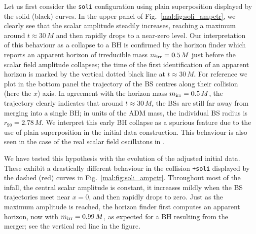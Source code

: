 %
Let us first consider the {\tt soli} configuration using plain
superposition displayed by the solid (black) curves. In the upper
panel of Fig.~\ref{mal:fig:soli_ampctr}, we clearly see
that the scalar amplitude steadily increases, reaching a maximum
around $t\approx 30\,M$ and then rapidly drops to a near-zero level.
Our interpretation of this behaviour as a collapse to a BH is confirmed
by the horizon finder which reports an apparent horizon of irreducible
mass $m_{\rm irr}=0.5\,M$ just before the scalar field amplitude
collapses; the time of the first identification of an apparent horizon
is marked by the vertical dotted black line at $t\approx 30\,M$.
For reference we plot in the bottom panel the trajectory of the BS centres
along their collision (here the $x$) axis. In agreement with the
horizon mass $m_{\rm irr}=0.5\,M$, the trajectory clearly indicates
that around $t\approx 30\,M$, the BSs are still far away from merging
into a single BH; in units of the ADM mass,
the individual BS radius is $r_{99}=2.78\,M$. We interpret
this early BH collapse as a spurious feature due to the use of
plain superposition in the initial data construction.
This behaviour is also seen in the case of the real scalar
field oscillatons in \cite{Helfer:2018vtq}.

We have tested this hypothesis with the evolution
of the adjusted initial data.
These exhibit a drastically different behaviour
in the collision {\tt +soli} displayed by the dashed (red) curves in
Fig.~\ref{mal:fig:soli_ampctr}.
Throughout most of the infall, the central scalar amplitude
is constant, it increases mildly when the BS trajectories meet near $x=0$,
and then rapidly drops to zero. Just as the maximum amplitude is reached,
the horizon finder first computes an apparent horizon, now with 
$m_{\rm irr}=0.99\,M$, as expected for a BH resulting from the merger;
see the vertical red line in the figure.

